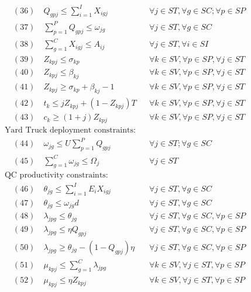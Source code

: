 \documentclass[11pt]{ctexart}
\begin{document}
\begin{align*}
& \quad (36) \quad Q_{gpj} \le \sum_{i=1}^{I} X_{igj} && \forall j \in ST, \forall g \in SC; \forall p \in SP \\
& \quad (37) \quad \sum_{p=1}^{P} Q_{gpj} \le \omega_{jg} && \forall j \in ST, \forall g \in SC \\
& \quad (38) \quad \sum_{g=1}^{C} X_{igj} \le A_{ij} && \forall j \in ST, \forall i \in SI \\
& \quad (39) \quad Z_{kpj} \le \sigma_{kp} && \forall k \in SV, \forall p \in SP, \forall j \in ST \\
& \quad (40) \quad Z_{kpj} \le \beta_{kj} && \forall k \in SV, \forall p \in SP, \forall j \in ST \\
& \quad (41) \quad Z_{kpj} \ge \sigma_{kp} + \beta_{kj} - 1 && \forall k \in SV, \forall p \in SP, \forall j \in ST \\
& \quad (42) \quad t_k \le j Z_{kpj} + (1 - Z_{kpj}) T && \forall k \in SV, \forall p \in SP, \forall j \in ST \\
& \quad (43) \quad c_k \ge (1 + j) Z_{kpj} && \forall k \in SV, \forall p \in SP, \forall j \in ST \\
& \text{Yard Truck deployment constraints:} \\
& \quad (44) \quad \omega_{jg} \le U \sum_{p=1}^{P} Q_{gpj} && \forall j \in ST; \forall g \in SC \\
& \quad (45) \quad \sum_{g=1}^{C} \omega_{jg} \le \Omega_j && \forall j \in ST \\
& \text{QC productivity constraints:} \\
& \quad (46) \quad \theta_{jg} \le \sum_{i=1}^{I} E_i X_{igj} && \forall j \in ST, \forall g \in SC \\
& \quad (47) \quad \theta_{jg} \le \omega_{jg} d && \forall j \in ST, \forall g \in SC \\
& \quad (48) \quad \lambda_{jpg} \le \theta_{jg} && \forall j \in ST, \forall g \in SC, \forall p \in SP \\
& \quad (49) \quad \lambda_{jpg} \le \eta Q_{gpj} && \forall j \in ST, \forall g \in SC, \forall p \in SP \\
& \quad (50) \quad \lambda_{jpg} \ge \theta_{jg} - (1 - Q_{gpj}) \eta && \forall j \in ST, \forall g \in SC, \forall p \in SP \\
& \quad (51) \quad \mu_{kpj} \le \sum_{g=1}^{C} \lambda_{jpg} && \forall k \in SV, \forall j \in ST, \forall p \in SP \\
& \quad (52) \quad \mu_{kpj} \le \eta Z_{kpj} && \forall k \in SV, \forall j \in ST, \forall p \in SP \\

\end{align*}
\end{document}
